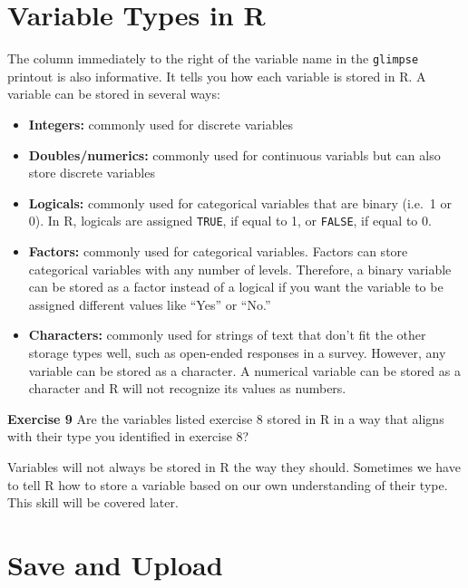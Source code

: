 \documentclass[
]{book}
\providecommand{\tightlist}{%
  \setlength{\itemsep}{0pt}\setlength{\parskip}{0pt}}
\newenvironment{rmdblock}[1]
  {\begin{shaded*}
  }
  {\end{shaded*}
  }
\newenvironment{learncheck}
  {\begin{rmdblock}{warning}}
  {\end{rmdblock}}
\begin{document}
\hypertarget{variable-types-in-r}{%
\section{Variable Types in R}\label{variable-types-in-r}}

The column immediately to the right of the variable name in the \texttt{glimpse} printout is also informative. It tells you how each variable is stored in R. A variable can be stored in several ways:

\begin{itemize}
\tightlist
\item
  \textbf{Integers:} commonly used for discrete variables
\item
  \textbf{Doubles/numerics:} commonly used for continuous variabls but can also store discrete variables
\item
  \textbf{Logicals:} commonly used for categorical variables that are binary (i.e.~1 or 0). In R, logicals are assigned \texttt{TRUE}, if equal to 1, or \texttt{FALSE}, if equal to 0.
\item
  \textbf{Factors:} commonly used for categorical variables. Factors can store categorical variables with any number of levels. Therefore, a binary variable can be stored as a factor instead of a logical if you want the variable to be assigned different values like ``Yes'' or ``No.''
\item
  \textbf{Characters:} commonly used for strings of text that don't fit the other storage types well, such as open-ended responses in a survey. However, any variable can be stored as a character. A numerical variable can be stored as a character and R will not recognize its values as numbers.
\end{itemize}

\begin{learncheck}
\textbf{Exercise 9} Are the variables listed exercise 8 stored in R in a
way that aligns with their type you identified in exercise 8?
\end{learncheck}

Variables will not always be stored in R the way they should. Sometimes we have to tell R how to store a variable based on our own understanding of their type. This skill will be covered later.

\hypertarget{save-and-upload-1}{%
\section{Save and Upload}\label{save-and-upload-1}}
\end{document}
